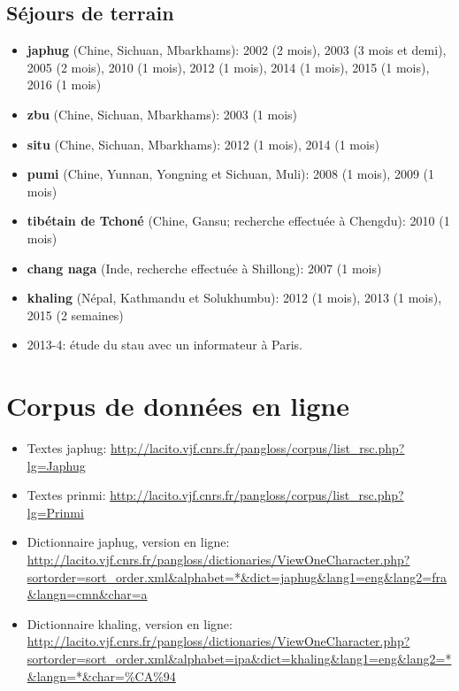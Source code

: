 \documentclass[oldfontcommands,oneside,a4paper,11pt]{article}
\begin{document}
\subsection*{Séjours de terrain} 
\begin{itemize}
\item   \textbf{japhug} (Chine, Sichuan, Mbarkhams): 2002 (2 mois), 2003 (3 mois et demi), 2005 (2 mois), 2010 (1 mois), 2012 (1 mois), 2014 (1 mois), 2015 (1 mois), 2016 (1 mois)
\item  \textbf{zbu} (Chine, Sichuan, Mbarkhams): 2003 (1 mois)
\item  \textbf{situ} (Chine, Sichuan, Mbarkhams): 2012 (1 mois), 2014 (1 mois)
\item  \textbf{pumi} (Chine, Yunnan, Yongning et Sichuan, Muli): 2008 (1 mois), 2009 (1 mois)
\item  \textbf{tibétain de Tchoné} (Chine, Gansu; recherche effectuée à Chengdu): 2010 (1 mois)
\item  \textbf{chang naga} (Inde, recherche effectuée à Shillong): 2007 (1 mois)
\item  \textbf{khaling} (Népal, Kathmandu et Solukhumbu): 2012 (1 mois), 2013 (1 mois), 2015 (2 semaines)
\item 2013-4: étude du stau avec un informateur à Paris.
  \end{itemize}
  
\section*{Corpus de données en ligne}
\begin{itemize}
\item Textes japhug: \url{http://lacito.vjf.cnrs.fr/pangloss/corpus/list_rsc.php?lg=Japhug}
\item Textes prinmi: \url{http://lacito.vjf.cnrs.fr/pangloss/corpus/list_rsc.php?lg=Prinmi}
\item Dictionnaire japhug, version en ligne: \url{http://lacito.vjf.cnrs.fr/pangloss/dictionaries/ViewOneCharacter.php?sortorder=sort_order.xml&alphabet=*&dict=japhug&lang1=eng&lang2=fra&langn=cmn&char=a}
\item Dictionnaire khaling, version en ligne: \url{http://lacito.vjf.cnrs.fr/pangloss/dictionaries/ViewOneCharacter.php?sortorder=sort_order.xml&alphabet=ipa&dict=khaling&lang1=eng&lang2=*&langn=*&char=\%CA\%94}
\end{itemize}
  
\end{document}
